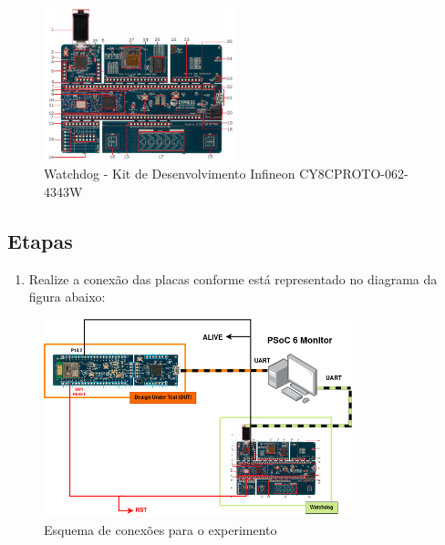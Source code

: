 \documentclass[12pt, a4paper]{article}
\begin{document}
\begin{figure}[H]
    \centering
    \caption{Watchdog - Kit de Desenvolvimento Infineon CY8CPROTO-062-4343W}
    \includegraphics[width=0.5\textwidth]{../imgs/psoc62_watchdog.png}

    \vspace{0.5em}
    \label{fig:watchdog}
\end{figure}

\subsection*{Etapas}

\begin{enumerate}[leftmargin=1.3cm]
    \item  Realize a conexão das placas conforme está representado no diagrama da figura abaixo:
\end{enumerate}

\begin{figure}[H]
    \centering
    \caption{Esquema de conexões para o experimento}
    \includegraphics[width=0.8\textwidth]{../imgs/esquema_ligacoes.png}

    \vspace{0.5em}
    \label{fig:diagrama_con}
\end{figure}
\end{document}
